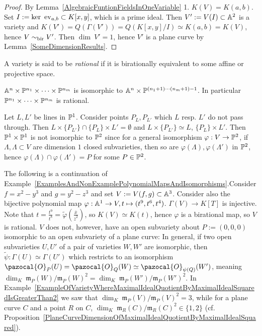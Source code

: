     \begin{proof}
        By Lemma~\ref{AlgebraicFuntionFieldsInOneVariable} 1. $K(V)=K(a,b)$. Set $I:= \ker \ \mathrm{ev}_{a,b}\subset K[x,y]$, which is a prime ideal. Then $V':= V(I)\subset \mathbb{A}^2$ is a variety and $K(V')= Q(\Gamma(V'))= Q(K[x,y]/I)\simeq K(a,b)=K(V)$, hence $V\sim_{\mathrm{bir}} V'$. Then $\dim \ V' = 1$, hence $V'$ is a plane curve by Lemma~\ref{SomeDimensionResults}.
    \end{proof}
    \begin{definition}
        A variety is said to be \textit{rational} if it is birationally equivalent to some affine or projective space. 
    \end{definition}
    \begin{example}
        $\mathbb{A}^n\times\mathbb{P}^{n_1}\times \cdots \times \mathbb{P}^{n_m}$ is isomorphic to $\mathbb{A}^n \times \mathbb{P}^{(n_1+1)\cdots (n_m+1)-1}$. In particular $\mathbb{P}^{n_1}\times \cdots \times \mathbb{P}^{n_m}$ is rational.
    \end{example}
    \begin{example}
        Let $L,L'$ be lines in $\mathbb{P}^1$. Consider points $P_L,P_{L'}$ which $L$ resp. $L'$ do not pass through. Then $L\times \{P_{L'}\}\cap \{P_L\}\times L'=\emptyset$ and $L\times \{P_{L'}\}\simeq L$, $\{P_L\}\times L'$. Then $\mathbb{P}^1\times \mathbb{P}^1$ is not isomorphic to $\mathbb{P}^2$ since for a general isomorphism $\varphi: V\rightarrow \mathbb{P}^2$, if $\Lambda,\Lambda\subset V$ are dimension $1$ closed subvarieties, then so are $\varphi(\Lambda),\varphi(\Lambda')$ in $\mathbb{P}^2$, hence $\varphi(\Lambda)\cap \varphi(\Lambda')=P$ for some $P\in \mathbb{P}^2$.
    \end{example}
    \begin{example}
        The following is a continuation of Example~\ref{ExamplesAndNonExamplePolynomialMapsAndIsomorphisms}.Consider $f=x^2-y^3$ and $g=y^2-z^3$ and set $V:=V(f,g)\subset \mathbb{A}^3$. Consider also the bijective polynomial map $\varphi: \mathbb{A}^1\rightarrow V, t\mapsto (t^9,t^6,t^4)$. $\Gamma(V)\rightarrow K[T]$ is injective. Note that $t=\frac{t^9}{t^8}=\widetilde{\varphi}(\frac{\overline{x}}{\overline{z}^2})$, so  $K(V)\simeq K(t)$, hence $\varphi$ is a birational map, so $V$ is rational. $V$ does not, however, have an open subvariety about $P:=(0,0,0)$ isomorphic to an open subvariety of a plane curve: In general, if two open subvarieties $U,U'$ of a pair of varieties $W,W'$ are isomorphic, then $\widetilde{\psi}:\Gamma(U)\simeq \Gamma(U')$ which restricts to an isomorphism $\pazocal{O}_P(U)=\pazocal{O}_Q(W)\simeq \pazocal{O}_{\psi(Q)}(W')$, meaning $\dim_K \ \mathfrak{m}_P(W)/\mathfrak{m}_P(W)^2=\dim_K \ \mathfrak{m}_P(W')/\mathfrak{m}_P(W')^2$.  In Example~\ref{ExampleOfVarietyWhereMaximalIdealQuotientByMaximalIdealSquaredIsGreaterThan2} we saw that $\dim_K \ \mathfrak{m}_P(V)/\mathfrak{m}_P(V)^2=3$, while for a plane curve $C$ and a point $R$ on $C$, $\dim_K \ \mathfrak{m}_R(C)/\mathfrak{m}_R(C)^2\in \{1,2\}$ (cf. Proposition~\ref{PlaneCurveDimensionOfMaximalIdealQuotientByMaximalIdealSquared}).
    \end{example}
